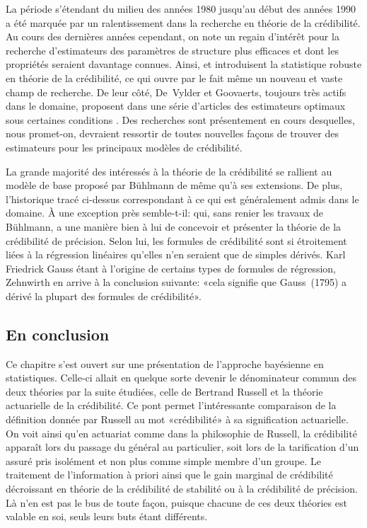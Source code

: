 La période s'étendant du milieu des années 1980 jusqu'au début des
années 1990 a été marquée par un ralentissement dans la recherche en
théorie de la crédibilité. Au cours des dernières années cependant, on
note un regain d'intérêt pour la recherche d'estimateurs des
paramètres de structure plus efficaces et dont les propriétés seraient
davantage connues. Ainsi, \cite{Kunsch:robust:1992} et
\cite{Gisler:robust:1993} introduisent la statistique robuste en
théorie de la crédibilité, ce qui ouvre par le fait même un nouveau et
vaste champ de recherche. De leur côté, De~Vylder et Goovaerts,
toujours très actifs dans le domaine, proposent dans une série
d'articles des estimateurs optimaux sous certaines conditions
\citep{DeVylder:zeroexcess:summary:1991,%
  DeVylder:zeroexcess:classical:1992,%
  DeVylder:zeroexcess:BS:1992}. Des recherches sont présentement en
cours desquelles, nous promet-on, devraient ressortir de toutes
nouvelles façons de trouver des estimateurs pour les principaux
modèles de crédibilité.

La grande majorité des intéressés à la théorie de la crédibilité se
rallient au modèle de base proposé par Bühlmann de même qu'à ses
extensions. De plus, l'historique tracé ci-dessus correspondant à ce
qui est généralement admis dans le domaine. À une exception près
semble-t-il: \cite{Zehnwirth:studyguide:1991} qui, sans renier les
travaux de Bühlmann, a une manière bien à lui de concevoir et
présenter la théorie de la crédibilité de précision. Selon lui, les
formules de crédibilité sont si étroitement liées à la régression
linéaires qu'elles n'en seraient que de simples dérivés. Karl
Friedrick Gauss étant à l'origine de certains types de formules de
régression, Zehnwirth en arrive à la conclusion suivante: «cela
signifie que Gauss~(1795) a dérivé la plupart des formules de
crédibilité».

\subsection{En conclusion}

Ce chapitre s'est ouvert sur une présentation de l'approche bayésienne
en statistiques. Celle-ci allait en quelque sorte devenir le
dénominateur commun des deux théories par la suite étudiées, celle de
Bertrand Russell et la théorie actuarielle de la crédibilité. Ce pont
permet l'intéressante comparaison de la définition donnée par Russell
au mot «crédibilité» à sa signification actuarielle. On voit ainsi
qu'en actuariat comme dans la philosophie de Russell, la crédibilité
apparaît lors du passage du général au particulier, soit lors de la
tarification d'un assuré pris isolément et non plus comme simple
membre d'un groupe. Le traitement de l'information à priori ainsi que
le gain marginal de crédibilité décroissant en théorie de la
crédibilité de stabilité ou à la crédibilité de précision. Là n'en est
pas le bus de toute façon, puisque chacune de ces deux théories est
valable en soi, seuls leurs buts étant différents.

